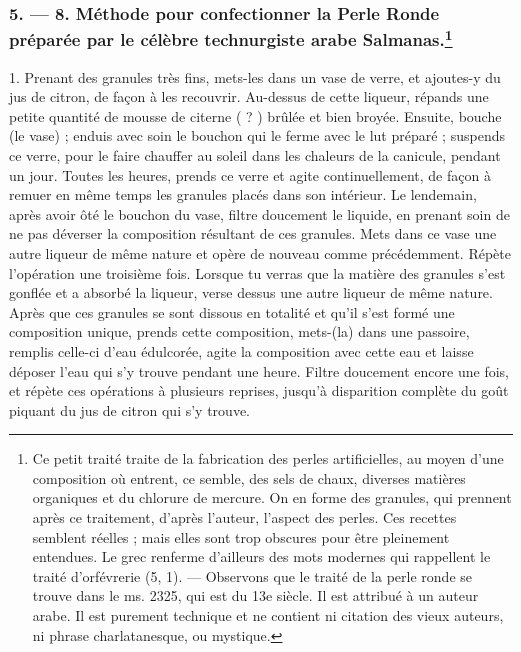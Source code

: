 \documentclass[a4paper, 11pt, oneside, polutonikogreek, french]{article}
\begin{document}
\subsubsection[5. --- 8. Méthode pour confectionner la Perle Ronde préparée par le célèbre technurgiste arabe Salmanas.]{5. --- 8. Méthode pour confectionner la Perle Ronde préparée par le célèbre technurgiste arabe Salmanas.\footnote{Ce petit traité traite de la fabrication des perles artificielles, au moyen d'une composition où entrent, ce semble, des sels de chaux, diverses matières organiques et du chlorure de mercure. On en forme des granules, qui prennent après ce traitement, d'après l'auteur, l'aspect des perles. Ces recettes semblent réelles ; mais elles sont trop obscures pour être pleinement entendues. Le grec renferme d'ailleurs des mots modernes qui rappellent le traité d'orfévrerie (5, 1). --- Observons que le traité de la perle ronde se trouve dans le ms. 2325, qui est du 13e siècle. Il est attribué à un auteur arabe. Il est purement technique et ne contient ni citation des vieux auteurs, ni phrase charlatanesque, ou mystique.}}

1. Prenant des granules très fins, mets-les dans un vase de verre, et ajoutes-y du jus de citron, de façon à les recouvrir. Au-dessus de cette liqueur, répands une petite quantité de mousse de citerne ( ? ) brûlée et bien broyée. Ensuite, bouche (le vase) ; enduis avec soin le bouchon qui le ferme avec le lut préparé ; suspends ce verre, pour le faire chauffer au soleil dans les chaleurs de la canicule, pendant un jour. Toutes les heures, prends ce verre et agite continuellement, de façon à remuer en même temps les granules placés dans son intérieur. Le lendemain, après avoir ôté le bouchon du vase, filtre doucement le liquide, en prenant soin de ne pas déverser la composition résultant de ces granules. Mets dans ce vase une autre liqueur de même nature et opère de nouveau comme précédemment. Répète l'opération une troisième fois. Lorsque tu verras que la matière des granules s'est gonflée et a absorbé la liqueur, verse dessus une autre liqueur de même nature. Après que ces granules se sont dissous en totalité et qu'il s'est formé une composition unique, prends cette composition, mets-(la) dans une passoire, remplis celle-ci d'eau édulcorée, agite la composition avec cette eau et laisse déposer l'eau qui s'y trouve pendant une heure. Filtre doucement encore une fois, et répète ces opérations à plusieurs reprises, jusqu'à disparition complète du goût piquant du jus de citron qui s'y trouve.
\end{document}
